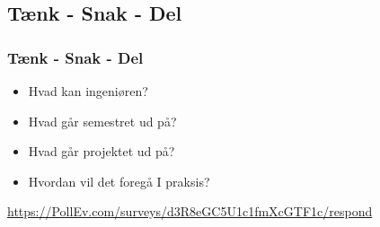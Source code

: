 \documentclass[t, aspectratio=169]{beamer}
\begin{document}
\subsection{Tænk - Snak - Del}
\begin{frame}[fragile]
  \frametitle{Tænk - Snak - Del}
  
  \vspace{15mm}
  \begin{itemize}
    \setlength\itemsep{3mm}
    \item Hvad kan ingeniøren?
    \item Hvad går semestret ud på?
    \item Hvad går projektet ud på?
    \item Hvordan vil det foregå I praksis?
  \end{itemize}
  
\end{frame}

\begin{frame}
  \vspace{4mm}
  \begin{center}
    
    \vspace{2mm}
    \Huge{\url{https://PollEv.com/surveys/d3R8eGC5U1c1fmXcGTF1c/respond}}
  \end{center}
\end{frame}
\end{document}
